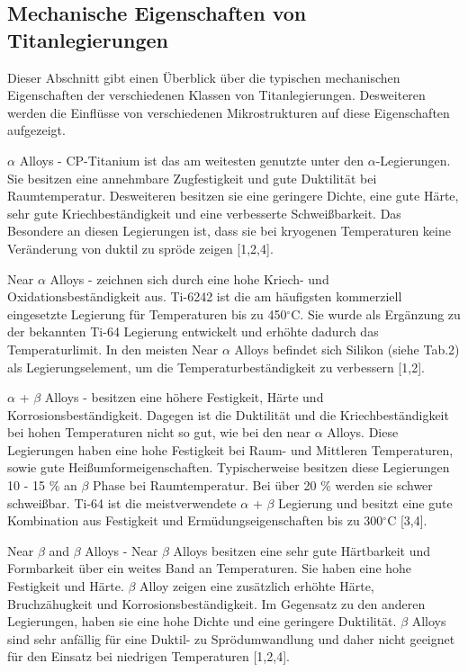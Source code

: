 \subsection{Mechanische Eigenschaften von Titanlegierungen}

Dieser Abschnitt gibt einen Überblick über die typischen mechanischen Eigenschaften der verschiedenen Klassen von Titanlegierungen. Desweiteren werden die Einflüsse von verschiedenen Mikrostrukturen auf diese Eigenschaften aufgezeigt.

$\alpha$ Alloys - CP-Titanium ist das am weitesten genutzte unter den $\alpha$-Legierungen. Sie besitzen eine annehmbare Zugfestigkeit und gute Duktilität bei Raumtemperatur. Desweiteren besitzen sie eine geringere Dichte, eine gute Härte, sehr gute Kriechbeständigkeit und eine verbesserte Schweißbarkeit. Das Besondere an diesen Legierungen ist, dass sie bei kryogenen Temperaturen keine Veränderung von duktil zu spröde zeigen [1,2,4].

Near $\alpha$ Alloys - zeichnen sich durch eine hohe Kriech- und Oxidationsbeständigkeit aus. Ti-6242 ist die am häufigsten kommerziell eingesetzte Legierung für Temperaturen bis zu 450$^\circ$C.
Sie wurde als Ergänzung zu der bekannten Ti-64 Legierung entwickelt und erhöhte dadurch das Temperaturlimit. In den meisten Near $\alpha$ Alloys befindet sich Silikon (siehe Tab.2) als Legierungselement, um die Temperaturbeständigkeit zu verbessern [1,2].

$\alpha$ + $\beta$ Alloys - besitzen eine höhere Festigkeit, Härte und Korrosionsbeständigkeit. Dagegen ist die Duktilität und die Kriechbeständigkeit bei hohen Temperaturen nicht so gut, wie bei den near $\alpha$ Alloys. Diese Legierungen haben eine hohe Festigkeit bei Raum- und Mittleren Temperaturen, sowie gute Heißumformeigenschaften. Typischerweise besitzen diese Legierungen 10 - 15 \% an $\beta$ Phase bei Raumtemperatur. Bei über 20 \% werden sie schwer schweißbar. Ti-64 ist die meistverwendete $\alpha$ + $\beta$ Legierung und besitzt eine gute Kombination aus Festigkeit und Ermüdungseigenschaften bis zu 300$^\circ$C [3,4].

Near $\beta$ and $\beta$ Alloys - Near $\beta$ Alloys besitzen eine sehr gute Härtbarkeit und Formbarkeit über ein weites Band an Temperaturen. Sie haben eine hohe Festigkeit und Härte.
$\beta$ Alloy zeigen eine zusätzlich erhöhte Härte, Bruchzähugkeit und Korrosionsbeständigkeit.
Im Gegensatz zu den anderen Legierungen, haben sie eine hohe Dichte und eine geringere Duktilität. $\beta$ Alloys sind sehr anfällig für eine Duktil- zu Sprödumwandlung und daher nicht geeignet für den Einsatz bei niedrigen Temperaturen [1,2,4].

